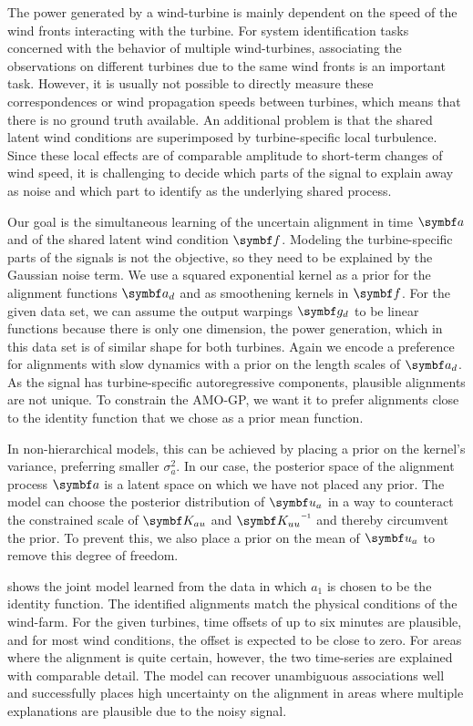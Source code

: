 The power generated by a wind-turbine is mainly dependent on the speed of the wind fronts interacting with the turbine.
For system identification tasks concerned with the behavior of multiple wind-turbines, associating the observations on different turbines due to the same wind fronts is an important task.
However, it is usually not possible to directly measure these correspondences or wind propagation speeds between turbines, which means that there is no ground truth available.
An additional problem is that the shared latent wind conditions are superimposed by turbine-specific local turbulence.
Since these local effects are of comparable amplitude to short-term changes of wind speed, it is challenging to decide which parts of the signal to explain away as noise and which part to identify as the underlying shared process.

Our goal is the simultaneous learning of the uncertain alignment in time $\rv{a}$ and of the shared latent wind condition $\rv{f}$.
Modeling the turbine-specific parts of the signals is not the objective, so they need to be explained by the Gaussian noise term.
We use a squared exponential kernel as a prior for the alignment functions $\rv{a}_d$ and as smoothening kernels in $\rv{f}$.
For the given data set, we can assume the output warpings $\rv{g}_d$ to be linear functions because there is only one dimension, the power generation, which in this data set is of similar shape for both turbines.
Again we encode a preference for alignments with slow dynamics with a prior on the length scales of $\rv{a}_d$.
As the signal has turbine-specific autoregressive components, plausible alignments are not unique.
To constrain the AMO-GP, we want it to prefer alignments close to the identity function that we chose as a prior mean function.

In non-hierarchical models, this can be achieved by placing a prior on the kernel's variance, preferring smaller $\sigma_a^2$.
In our case, the posterior space of the alignment process $\rv{a}$ is a latent space on which we have not placed any prior.
The model can choose the posterior distribution of $\rv{u}_a$ in a way to counteract the constrained scale of $\mat{K_{au}}$ and $\mat{K_{uu}}\inv$ and thereby circumvent the prior.
To prevent this, we also place a prior on the mean of $\rv{u}_a$ to remove this degree of freedom.

 shows the joint model learned from the data in which $a_1$ is chosen to be the identity function.
The identified alignments match the physical conditions of the wind-farm.
For the given turbines, time offsets of up to six minutes are plausible, and for most wind conditions, the offset is expected to be close to zero.
For areas where the alignment is quite certain, however, the two time-series are explained with comparable detail.
The model can recover unambiguous associations well and successfully places high uncertainty on the alignment in areas where multiple explanations are plausible due to the noisy signal.


